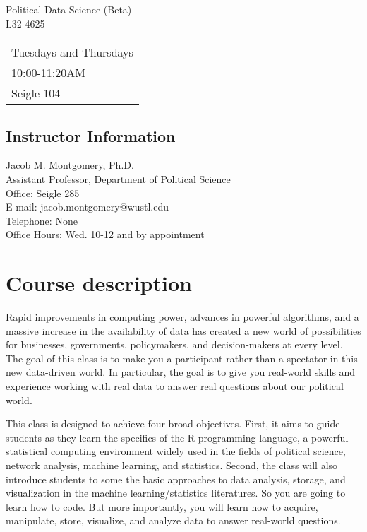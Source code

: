 \documentclass[11pt]{article}
\begin{document}
\pagestyle{plain} 

\begin{center}

\vspace{5pt}
\Large{Political Data Science (Beta) }\\
\Large{L32 4625}
\vspace{4 mm}

\small


\vspace{4 mm}

     \begin{tabular}{l }
       Tuesdays and Thursdays\\
      10:00-11:20AM \\
      Seigle 104
       \end{tabular}
\end{center}

\subsection*{Instructor Information}

\noindent Jacob M. Montgomery, Ph.D.\\
\noindent Assistant Professor, Department of Political Science\\
Office: Seigle 285\\
E-mail: jacob.montgomery@wustl.edu\\
Telephone: None \\
Office Hours: Wed. 10-12 and by appointment 

\section*{Course description}


Rapid improvements in computing power, advances in powerful
algorithms, and a massive increase in the availability of data has
created a new world of possibilities for businesses, governments,
policymakers, and decision-makers at every level. The goal of this
class is to make you a participant rather than a spectator in this new
data-driven world.  In particular, the goal is to give you real-world
skills and experience working with real data to answer real questions
about our political world.

This class is designed to achieve four broad objectives. First, it
aims to guide students as they learn the specifics of the R
programming language, a powerful statistical computing environment
widely used in the fields of political science, network analysis,
machine learning, and statistics.  Second, the class will also
introduce students to some the basic approaches to data analysis,
storage, and visualization in the machine learning/statistics
literatures.  So you are going to learn how to code. But more
importantly, you will learn how to acquire, manipulate, store,
visualize, and analyze data to answer real-world questions.
\end{document}
